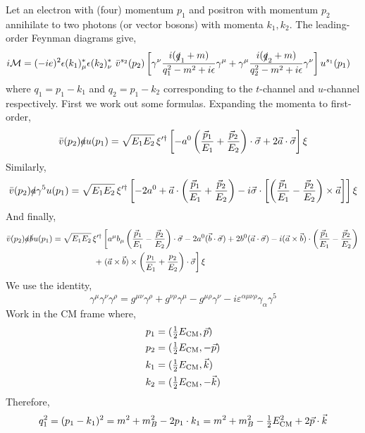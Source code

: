 \documentclass[12pt]{article}
\newcommand{\cM}{\mathcal{M}}
\begin{document}
Let an electron with (four) momentum $p_1$ and positron with momentum $p_2$ annihilate to two photons (or vector bosons) with momenta $k_1, k_2$. The leading-order Feynman diagrams give,
\begin{align*}
i \cM = (-i e)^2 & \epsilon(k_1)^*_{\mu} \epsilon(k_2)^*_{\nu} \, \, \bar{v}^{s_2}(p_2) \left[ \gamma^{\nu} \frac{i(\slashed{q}_1 + m)}{q_1^2 - m^2 + i \epsilon} \gamma^\mu + \gamma^{\mu} \frac{i(\slashed{q}_2 + m)}{q_2^2 - m^2 + i \epsilon} \gamma^{\nu} \right] u^{s_1}(p_1)
\end{align*}
where $q_1 = p_1 - k_1$ and $q_2 = p_1 - k_2$ corresponding to the $t$-channel and $u$-channel respectively. First we work out some formulas. Expanding the momenta to first-order,
\[ \bar{v}(p_2) \slashed{a} u(p_1) = \sqrt{E_1 E_2} \, \xi'^{\dagger} \left[ - a^0 \left( \frac{\vec{p}_1}{E_1} + \frac{\vec{p}_2}{E_2} \right) \cdot \vec{\sigma} + 2 \vec{a} \cdot \vec{\sigma} \right] \xi  \]
Similarly,
\[ \bar{v}(p_2) \slashed{a} \gamma^5 u(p_1) = \sqrt{E_1 E_2} \, \xi'^{\dagger} \left[ - 2 a^0 + \vec{a} \cdot \left( \frac{\vec{p}_1}{E_1} + \frac{\vec{p}_2}{E_2} \right) - i \vec{\sigma} \cdot \left[ \left( \frac{\vec{p}_1}{E_1} - \frac{\vec{p}_2}{E_2} \right) \times \vec{a} \right] \right] \xi \]
And finally,
\begin{align*}
\bar{v}(p_2) \slashed{a} \slashed{b} u(p_1) = \sqrt{E_1 E_2} \, \xi'^{\dagger} & \left[ a^\mu b_\mu \left( \frac{\vec{p}_1}{E_1} - \frac{\vec{p}_2}{E_2} \right) \cdot \vec{\sigma} - 2 a^0 (\vec{b} \cdot \vec{\sigma}) + 2 b^0 (\vec{a} \cdot \vec{\sigma}) - i (\vec{a} \times \vec{b}) \cdot \left( \frac{\vec{p}_1}{E_1} - \frac{\vec{p}_2}{E_2} \right) \right.
\\
+ & \left. (\vec{a} \times \vec{b}) \times \left( \frac{p_1}{E_1} + \frac{p_2}{E_2} \right) \cdot \vec{\sigma} \right] \xi 
\end{align*}
We use the identity,
\[ \gamma^\mu \gamma^\nu \gamma^\rho = g^{\mu \nu} \gamma^\rho + g^{\nu \rho} \gamma^\mu - g^{\mu \rho} \gamma^\nu - i \varepsilon^{\alpha \mu \nu \rho} \gamma_\alpha  \gamma^5 \]
Work in the CM frame where,
\begin{align*}
p_1 &= (\tfrac{1}{2} E_{\mathrm{CM}}, \vec{p})
\\
p_2 & = (\tfrac{1}{2} E_{\mathrm{CM}}, -\vec{p})
\\
k_1 & = (\tfrac{1}{2} E_{\mathrm{CM}}, \vec{k})
\\
k_2 & = (\tfrac{1}{2} E_{\mathrm{CM}}, -\vec{k})
\end{align*}
Therefore,
\[ q_1^2 = (p_1 - k_1)^2 = m^2 + m_B^2 - 2 p_1 \cdot k_1 = m^2 + m_B^2 - \tfrac{1}{2} E_{\mathrm{CM}}^2 + 2 \vec{p} \cdot \vec{k} \]
\end{document}
